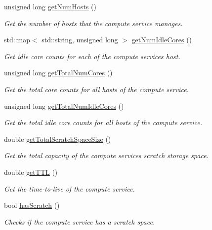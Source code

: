 \begin{DoxyCompactItemize}
unsigned long \hyperlink{classwrench_1_1_compute_service_a1b576a22529bd638e6998f0513a44b36}{get\+Num\+Hosts} ()
\begin{DoxyCompactList}\small\item\em Get the number of hosts that the compute service manages. \end{DoxyCompactList}\item 
std\+::map$<$ std\+::string, unsigned long $>$ \hyperlink{classwrench_1_1_compute_service_a7d717171627835491772e589c4e6101f}{get\+Num\+Idle\+Cores} ()
\begin{DoxyCompactList}\small\item\em Get idle core counts for each of the compute service\textquotesingle{}s host. \end{DoxyCompactList}\item 
unsigned long \hyperlink{classwrench_1_1_compute_service_a5d2e4bca8b531521561f167769186f56}{get\+Total\+Num\+Cores} ()
\begin{DoxyCompactList}\small\item\em Get the total core counts for all hosts of the compute service. \end{DoxyCompactList}\item 
unsigned long \hyperlink{classwrench_1_1_compute_service_a225719efa4cb6c3b910c20e8828cb789}{get\+Total\+Num\+Idle\+Cores} ()
\begin{DoxyCompactList}\small\item\em Get the total idle core counts for all hosts of the compute service. \end{DoxyCompactList}\item 
double \hyperlink{classwrench_1_1_compute_service_ae0a8acd4a82063250799e313f1d520d1}{get\+Total\+Scratch\+Space\+Size} ()
\begin{DoxyCompactList}\small\item\em Get the total capacity of the compute service\textquotesingle{}s scratch storage space. \end{DoxyCompactList}\item 
double \hyperlink{classwrench_1_1_compute_service_a244e08a35ea94061acc1396f9447bb0c}{get\+T\+TL} ()
\begin{DoxyCompactList}\small\item\em Get the time-\/to-\/live of the compute service. \end{DoxyCompactList}\item 
bool \hyperlink{classwrench_1_1_compute_service_a07b64249656b26fef280c1f9db823acf}{has\+Scratch} ()
\begin{DoxyCompactList}\small\item\em Checks if the compute service has a scratch space. \end{DoxyCompactList}\item 

\end{DoxyCompactItemize}
